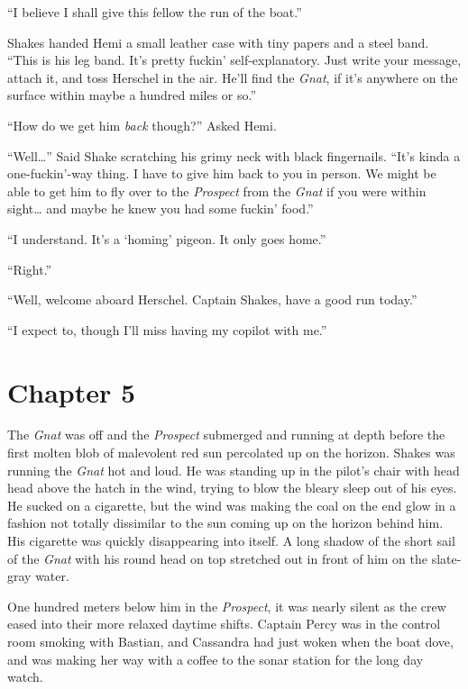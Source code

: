 \documentclass[]{scrbook}
\begin{document}
``I believe I shall give this fellow the run of the boat.''

Shakes handed Hemi a small leather case with tiny papers and a steel
band. ``This is his leg band. It's pretty fuckin' self-explanatory. Just
write your message, attach it, and toss Herschel in the air. He'll find
the \emph{Gnat}, if it's anywhere on the surface within maybe a hundred
miles or so.''

``How do we get him \emph{back} though?'' Asked Hemi.

``Well\ldots{}'' Said Shake scratching his grimy neck with black
fingernails. ``It's kinda a one-fuckin'-way thing. I have to give him
back to you in person. We might be able to get him to fly over to the
\emph{Prospect} from the \emph{Gnat} if you were within sight\ldots{}
and maybe he knew you had some fuckin' food.''

``I understand. It's a `homing' pigeon. It only goes home.''

``Right.''

``Well, welcome aboard Herschel. Captain Shakes, have a good run
today.''

``I expect to, though I'll miss having my copilot with me.''

\hypertarget{chapter-5}{%
\chapter*{Chapter 5}\label{chapter-5}}

The \emph{Gnat} was off and the \emph{Prospect} submerged and running at
depth before the first molten blob of malevolent red sun percolated up
on the horizon. Shakes was running the \emph{Gnat} hot and loud. He was
standing up in the pilot's chair with head head above the hatch in the
wind, trying to blow the bleary sleep out of his eyes. He sucked on a
cigarette, but the wind was making the coal on the end glow in a fashion
not totally dissimilar to the sun coming up on the horizon behind him.
His cigarette was quickly disappearing into itself. A long shadow of the
short sail of the \emph{Gnat} with his round head on top stretched out
in front of him on the slate-gray water.

One hundred meters below him in the \emph{Prospect}, it was nearly
silent as the crew eased into their more relaxed daytime shifts. Captain
Percy was in the control room smoking with Bastian, and Cassandra had
just woken when the boat dove, and was making her way with a coffee to
the sonar station for the long day watch.
\end{document}
